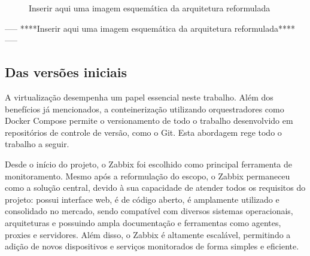 {%

\begin{figure}[H]
\centering
\fbox{\rule{0pt}{150pt} \rule{200pt}{0pt}} %
\caption{Inserir aqui uma imagem esquemática da arquitetura reformulada}
\label{fig:placeholder}
\end{figure}

-----
****Inserir aqui uma imagem esquemática da arquitetura reformulada****
-----


\subsection{Das versões iniciais}
\label{subsection:VersõesIniciais}



A virtualização desempenha um papel essencial neste trabalho. Além dos benefícios já mencionados, a conteinerização utilizando orquestradores como Docker Compose permite o versionamento de todo o trabalho desenvolvido em repositórios de controle de versão, como o Git. Esta abordagem rege todo o trabalho a seguir.

Desde o início do projeto, o Zabbix foi escolhido como principal ferramenta de monitoramento. Mesmo após a reformulação do escopo, o Zabbix permaneceu como a solução central, devido à sua capacidade de atender todos os requisitos do projeto: possui interface web, é de código aberto, é amplamente utilizado e consolidado no mercado, sendo compatível com diversos sistemas operacionais, arquiteturas e possuindo ampla documentação e ferramentas como agentes, proxies e servidores. Além disso, o Zabbix é altamente escalável, permitindo a adição de novos dispositivos e serviços monitorados de forma simples e eficiente.

}
